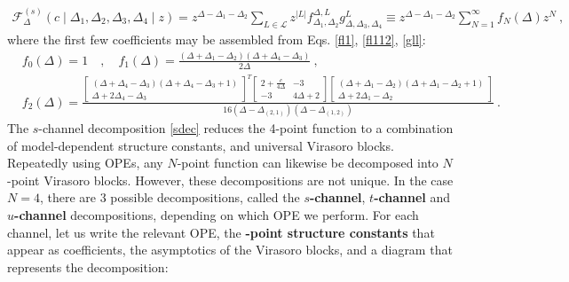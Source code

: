 \documentclass[12pt, a4paper]{article}
\newcommand{\myindex}[1]{\textbf{\boldmath #1}}
\theoremstyle{break}
\begin{document}
\begin{align}
 \mathcal{F}_{\Delta}^{(s)}\left(c\middle|\Delta_1,\Delta_2,\Delta_3,\Delta_4\middle|z\right) = z^{\Delta-\Delta_1-\Delta_2}\sum_{L\in\mathcal{L}} z^{|L|} f_{\Delta_1,\Delta_2}^{\Delta,L}g^L_{\Delta,\Delta_3,\Delta_4}\equiv z^{\Delta-\Delta_1-\Delta_2}\sum_{N=1}^\infty f_N(\Delta)z^N \ ,
 \label{fsl}
\end{align}
where the first few coefficients may be assembled from Eqs. \eqref{fl1}, \eqref{fl112}, \eqref{gll}:
\begin{align}
& f_0(\Delta) = 1 \quad , \quad f_1(\Delta) = \frac{(\Delta+\Delta_1-\Delta_2)(\Delta+\Delta_4-\Delta_3)}{2\Delta} \ ,
\\
& f_2(\Delta) =  \frac{\left[\begin{smallmatrix} (\Delta+\Delta_4-\Delta_3)(\Delta+\Delta_4-\Delta_3+1) \\ \Delta+2\Delta_4-\Delta_3 \end{smallmatrix}\right]^T
\left[\begin{smallmatrix} 2+\frac{c}{4\Delta} & -3 \\ -3 & 4\Delta+2 \end{smallmatrix}\right]
\left[\begin{smallmatrix} (\Delta+\Delta_1-\Delta_2)(\Delta+\Delta_1-\Delta_2+1) \\ \Delta+2\Delta_1-\Delta_2 \end{smallmatrix}\right]}{16(\Delta-\Delta_{(2,1)})(\Delta-\Delta_{(1,2)})}
 \ .
 \label{f2d}
\end{align}
The $s$-channel decomposition \eqref{sdec} reduces the 4-point function to a combination of model-dependent structure constants, and universal Virasoro blocks. Repeatedly using OPEs, any $N$-point function can likewise be decomposed into $N$-point Virasoro blocks. However, these decompositions are not unique. In the case $N=4$, there are 3 possible decompositions, called the \myindex{$s$-channel}, \myindex{$t$-channel} and \myindex{$u$-channel} decompositions, depending on which OPE we perform. For each channel, let us write the relevant OPE, the \myindex{4-point structure constants} that appear as coefficients, the asymptotics of the Virasoro blocks, and a diagram that represents the decomposition:
\end{document}

